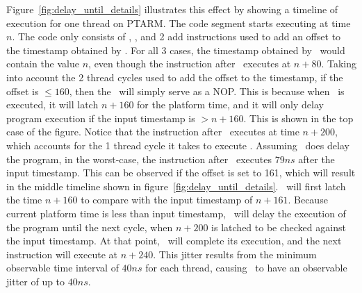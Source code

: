Figure~\ref{fig:delay_until_details} illustrates this effect by showing a timeline of execution for one thread on PTARM. 
The code segment starts executing at time $n$. 
The code only consists of \gettime, \delayuntil, and 2 add instructions used to add an offset to the timestamp obtained by \gettime.
For all 3 cases, the timestamp obtained by \gettime\ would contain the value $n$, even though the instruction after \gettime\ executes at $n+80$.
Taking into account the 2 thread cycles used to add the offset to the timestamp, if the offset is $\leq 160$, then the \delayuntil\ will simply serve as a NOP. 
This is because when \delayuntil\ is executed, it will latch $n+160$ for the platform time, and it will only delay program execution if the input timestamp is $> n+160$.
This is shown in the top case of the figure.
Notice that the instruction after \delayuntil\ executes at time $n+200$, which accounts for the 1 thread cycle it takes to execute \delayuntil.
Assuming \delayuntil\ does delay the program, in the worst-case, the instruction after \delayuntil\ executes $79 ns$ after the input timestamp. 
This can be observed if the offset is set to 161, which will result in the middle timeline shown in figure~\ref{fig:delay_until_details}.  
\Delayuntil\ will first latch the time $n+160$ to compare with the input timestamp of $n+161$. 
Because current platform time is less than input timestamp, \delayuntil\ will delay the execution of the program until the next cycle, when $n+200$ is latched to be checked against the input timestamp. 
At that point, \delayuntil\ will complete its execution, and the next instruction will execute at $n+240$.
This jitter results from the minimum observable time interval of $40 ns$ for each thread, causing \delayuntil\ to have an observable jitter of up to $40 ns$. 
